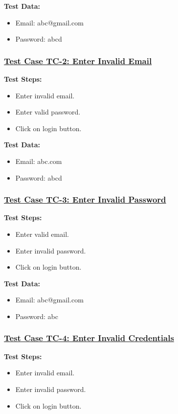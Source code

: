 \textbf{Test Data:}
\begin{itemize}

\item Email: abc@gmail.com
\item Password: abcd

\end{itemize}

\subsubsection{\underline{Test Case TC-2: Enter Invalid Email}}
\textbf{Test Steps:}
\begin{itemize}

\item Enter invalid email.
\item Enter valid password.
\item Click on login button.

\end{itemize}

\textbf{Test Data:}
\begin{itemize}

\item Email: abc.com
\item Password: abcd

\end{itemize}

\subsubsection{\underline{Test Case TC-3: Enter Invalid Password}}
\textbf{Test Steps:}
\begin{itemize}

\item Enter valid email.
\item Enter invalid password.
\item Click on login button.

\end{itemize}

\textbf{Test Data:}
\begin{itemize}

\item Email: abc@gmail.com
\item Password: abc

\end{itemize}

\subsubsection{\underline{Test Case TC-4: Enter Invalid Credentials}}
\textbf{Test Steps:}
\begin{itemize}

\item Enter invalid email.
\item Enter invalid password.
\item Click on login button.

\end{itemize}

